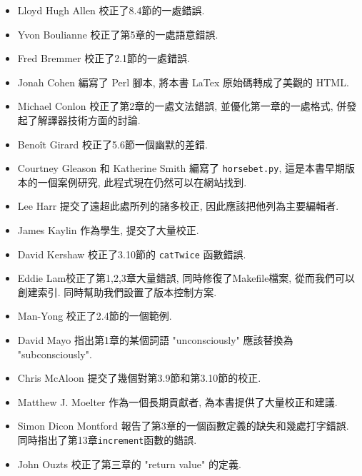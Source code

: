 \documentclass[10pt]{book}
\begin{document}
\begin{itemize}

\small
\item Lloyd Hugh Allen 校正了8.4節的一處錯誤. 

\item Yvon Boulianne 校正了第5章的一處語意錯誤. 

\item Fred Bremmer 校正了2.1節的一處錯誤. 

\item Jonah Cohen 編寫了 Perl 腳本, 將本書 LaTex 原始碼轉成了美觀的 HTML. 

\item Michael Conlon 校正了第2章的一處文法錯誤, 並優化第一章的一處格式, 併發起了解譯器技術方面的討論. 

\item Beno\^{i}t Girard 校正了5.6節一個幽默的差錯. 

\item Courtney Gleason 和 Katherine Smith 編寫了 {\tt horsebet.py}, 
這是本書早期版本的一個案例研究, 此程式現在仍然可以在網站找到. 

\item Lee Harr 提交了遠超此處所列的諸多校正, 因此應該把他列為主要編輯者. 

\item James Kaylin 作為學生, 提交了大量校正. 

\item David Kershaw 校正了3.10節的 {\tt catTwice} 函數錯誤. 

\item Eddie Lam校正了第1,2,3章大量錯誤, 同時修復了Makefile檔案, 
從而我們可以創建索引. 同時幫助我們設置了版本控制方案. 

\item Man-Yong 校正了2.4節的一個範例. 

\item David Mayo 指出第1章的某個詞語 "unconsciously"
應該替換為 "subconsciously".

\item Chris McAloon 提交了幾個對第3.9節和第3.10節的校正. 

\item Matthew J. Moelter 作為一個長期貢獻者, 為本書提供了大量校正和建議. 

\item Simon Dicon Montford 報告了第3章的一個函數定義的缺失和幾處打字錯誤. 同時指出了第13章{\tt increment}函數的錯誤. 

\item John Ouzts 校正了第三章的 "return value" 的定義. 


\end{itemize}
\end{document}
